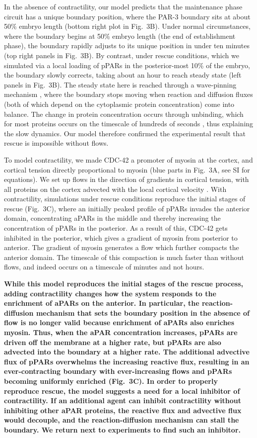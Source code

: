 \documentclass[11pt]{article}
\newcommand{\6}[1]{#1_{\text{6}}}
\newcommand{\3}[1]{#1_{\text{3}}}
\begin{document}
In the absence of contractility, our model predicts that the maintenance phase circuit has a unique boundary position, where the PAR-3 boundary sits at about 50\% embryo length (bottom right plot in Fig.\ 3B). Under normal circumstances, where the boundary begins at 50\% embryo length (the end of establishment phase), the boundary rapidly adjusts to its unique position in under ten minutes (top right panels in Fig.\ 3B). By contrast, under rescue conditions, which we simulated via a local loading of pPARs in the posterior-most 10\% of the embryo, the boundary slowly corrects, taking about an hour to reach steady state (left panels in Fig.\ 3B). The steady state here is reached through a wave-pinning mechanism \citep{mori2008wave, goehring2011polarization}, where the boundary stops moving when reaction and diffusion fluxes (both of which depend on the cytoplasmic protein concentration) come into balance. The change in protein concentration occurs through unbinding, which for most proteins occurs on the timescale of hundreds of seconds \citep{robin2014single}, thus explaining the slow dynamics. Our model therefore confirmed the experimental result that rescue is impossible without flows.

To model contractility, we made CDC-42 a promoter of myosin at the cortex, and cortical tension directly proportional to myosin (blue parts in Fig.\ 3A, see SI for equations). We set up flows in the direction of gradients in cortical tension, with all proteins on the cortex advected with the local cortical velocity \citep{illukkumbura2023design}. With contractility, simulations under rescue conditions reproduce the initial stages of rescue (Fig.\ 3C), where an initially peaked profile of pPARs invades the anterior domain, concentrating aPARs in the middle and thereby increasing the concentration of pPARs in the posterior. As a result of this, CDC-42 gets inhibited in the posterior, which gives a gradient of myosin from posterior to anterior. The gradient of myosin generates a flow which further compacts the anterior domain. The timescale of this compaction is much faster than without flows, and indeed occurs on a timescale of minutes and not hours.

\textbf{While this model reproduces the initial stages of the rescue process, adding contractility changes how the system responds to the enrichment of aPARs on the anterior. In particular, the reaction-diffusion mechanism that sets the boundary position in the absence of flow is no longer valid because enrichment of aPARs also enriches myosin. Thus, when the aPAR concentration increases, pPARs are driven off the membrane at a higher rate, but pPARs are also advected into the boundary at a higher rate. The additional advective flux of pPARs overwhelms the increasing reactive flux, resulting in an ever-contracting boundary with ever-increasing flows and pPARs becoming uniformly enriched (Fig.\ 3C). In order to properly reproduce rescue, the model suggests a need for a local inhibitor of contractility. If an additional agent can inhibit contractility without inhibiting other aPAR proteins, the reactive flux and advective flux would decouple, and the reaction-diffusion mechanism can stall the boundary. We return next to experiments to find such an inhibitor.}
\end{document}
